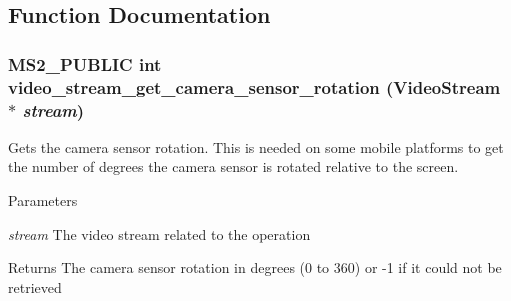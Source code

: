 \subsection{Function Documentation}
\subsubsection[{video\_\-stream\_\-get\_\-camera\_\-sensor\_\-rotation}]{\setlength{\rightskip}{0pt plus 5cm}MS2\_\-PUBLIC int video\_\-stream\_\-get\_\-camera\_\-sensor\_\-rotation (VideoStream $\ast$ {\em stream})}\label{group__video__stream__api_gaf25cfc554090527e3033e9da4ef8b77f}


Gets the camera sensor rotation. This is needed on some mobile platforms to get the number of degrees the camera sensor is rotated relative to the screen.


\begin{DoxyParams}{Parameters}
\item[{\em stream}]The video stream related to the operation \end{DoxyParams}
\begin{DoxyReturn}{Returns}
The camera sensor rotation in degrees (0 to 360) or -\/1 if it could not be retrieved 
\end{DoxyReturn}
